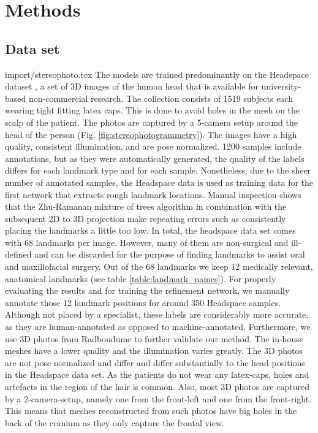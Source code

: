 \documentclass[class=article, crop=false]{standalone}
\begin{document}
\section{Methods}
\label{sec:methods}

\subsection{Data set}
{import/stereophoto.tex}
The models are trained predominantly on the Headspace dataset \cite{Dai2019}, a set of 3D images of the human head that is available for university-based non-commercial research. The collection consists of 1519 subjects each wearing tight fitting latex caps. This is done to avoid holes in the mesh on the scalp of the patient. The photos are captured by a 5-camera setup around the head of the person (Fig. \ref{fig:stereophotogrammetry}). The images have a high quality, consistent illumination, and are pose normalized. 1200 samples include annotations, but as they were automatically generated, the quality of the labels differs for each landmark type and for each sample. Nonetheless, due to the sheer number of annotated samples, the Headspace data is used as training data for the first network that extracts rough landmark locations. Manual inspection shows that the Zhu-Ramanan mixture of trees algorithm in combination with the subsequent 2D to 3D projection make repeating errors such as consistently placing the landmarks a little too low. %
In total, the headspace data set comes with 68 landmarks per image. However, many of them are non-surgical and ill-defined and can be discarded for the purpose of finding landmarks to assist oral and maxillofacial surgery. Out of the 68 landmarks we keep 12 medically relevant, anatomical landmarks (see table \ref{table:landmark_names}). For properly evaluating the results and for training the refinement network, we manually annotate those 12 landmark positions for around 350 Headspace samples. Although not placed by a specialist, these labels are considerably more accurate, as they are human-annotated as opposed to machine-annotated.
Furthermore, we use 3D photos from Radboudumc to further validate our method. The in-house meshes have a lower quality and the illumination varies greatly. The 3D photos are not pose normalized and differ and differ substantially to the head positions in the Headspace data set. As the patients do not wear any latex-caps, holes and artefacts in the region of the hair is common. Also, most 3D photos are captured by a 2-camera-setup, namely one from the front-left and one from the front-right. This means that meshes reconstructed from such photos have big holes in the back of the cranium as they only capture the frontal view.
\end{document}
